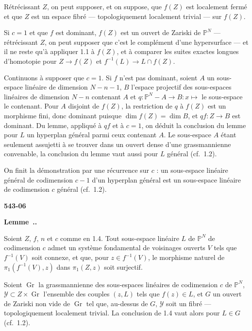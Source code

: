 \documentclass[12pt,a4paper]{article}
\newcounter{secitem}
\renewcommand{\thesecitem}{\thesection.\arabic{secitem}}
\newenvironment{seclemma}{%
  \refstepcounter{secitem}%
  \par\medskip\noindent\textbf{Lemme~\thesecitem.}~\ignorespaces
}{\par\medskip}
\DeclareMathOperator{\Gr}{Gr}
\begin{document}
Rétrécissant $Z$, on peut supposer, et on suppose, que $f(Z)$ est localement fermé et que $Z$ est un espace fibré --- topologiquement localement trivial --- sur $f(Z)$.

Si $c = 1$ et que $f$ est dominant, $f(Z)$ est un ouvert de Zariski de $\mathbb{P}^N$ --- rétrécissant $Z$, on peut supposer que c'est le complément d'une hypersurface --- et il ne reste qu'à appliquer 1.1 à $f(Z)$, et à comparer les suites exactes longues d'homotopie pour $Z \to f(Z)$ et $f^{-1}(L) \to L \cap f(Z)$.

Continuons à supposer que $c = 1$. Si $f$ n'est pas dominant, soient $A$ un sous-espace linéaire de dimension $N - n - 1$, $B$ l'espace projectif des sous-espaces linéaires de dimension $N - n$ contenant $A$ et $q : \mathbb{P}^N - A \to B : x \mapsto$ le sous-espace le contenant. Pour $A$ disjoint de $f(Z)$, la restriction de $q$ à $f(Z)$ est un morphisme fini, donc dominant puisque $\dim f(Z) = \dim B$, et $qf : Z \to B$ est dominant. Du lemme, appliqué à $qf$ et à $c = 1$, on déduit la conclusion du lemme pour $L$ un hyperplan général parmi ceux contenant $A$. Le sous-espace $A$ étant seulement assujetti à se trouver dans un ouvert dense d'une grassmannienne convenable, la conclusion du lemme vaut aussi pour $L$ général (cf.\ 1.2).

On finit la démonstration par une récurrence sur $c$ : un sous-espace linéaire général de codimension $c - 1$ d'un hyperplan général est un sous-espace linéaire de codimension $c$ général (cf.\ 1.2).

\newpage
\begin{flushright}
\textbf{543-06}
\end{flushright}

\begin{seclemma}
Soient $Z$, $f$, $n$ et $c$ comme en 1.4. Tout sous-espace linéaire $L$ de $\mathbb{P}^N$ de codimension $c$ admet un système fondamental de voisinages ouverts $V$ tels que $f^{-1}(V)$ soit connexe, et que, pour $z \in f^{-1}(V)$, le morphisme naturel de $\pi_1(f^{-1}(V), z)$ dans $\pi_1(Z, z)$ soit surjectif.
\end{seclemma}

Soient $\Gr$ la grassmannienne des sous-espaces linéaires de codimension $c$ de $\mathbb{P}^N$, $\mathcal{Y} \subset Z \times \Gr$ l'ensemble des couples $(z, L)$ tels que $f(z) \in L$, et $G$ un ouvert de Zariski non vide de $\Gr$ tel que, au-dessus de $G$, $\mathcal{Y}$ soit un fibré --- topologiquement localement trivial. La conclusion de 1.4 vaut alors pour $L \in G$ (cf.\ 1.2).
\end{document}
